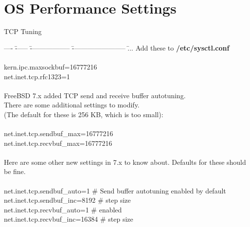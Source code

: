 \documentclass[xcolor=dvipsnames]{beamer}
\begin{document}
\section{OS Performance Settings}
	\begin{frame}{TCP Tuning}
	\scriptsize
	{
	\begin{tabbing}
		---- \= ------ \= ------------------ \= ------------------------ \=  ... \kill
		Add these to \textbf{/etc/sysctl.conf} \\ \\
		\> kern.ipc.maxsockbuf=16777216 \\
		\> net.inet.tcp.rfc1323=1 \\
		\\ FreeBSD 7.x added TCP send and receive buffer autotuning.
		\\ There are some additional settings to modify.
		\\ (The default for these is 256 KB, which is too small):\\ \\
		\> net.inet.tcp.sendbuf\_max=16777216 \\
		\> net.inet.tcp.recvbuf\_max=16777216 \\
		\\ Here are some other new settings in 7.x to know about. Defaults for these should be fine.\\ \\
		\> net.inet.tcp.sendbuf\_auto=1    \>\>\> \# Send buffer autotuning enabled by default\\
		\> net.inet.tcp.sendbuf\_inc=8192  \>\>\> \# step size\\
		\> net.inet.tcp.recvbuf\_auto=1    \>\>\> \# enabled\\
		\> net.inet.tcp.recvbuf\_inc=16384 \>\>\> \# step size\\
	\end{tabbing}
	}
	\end{frame}
\end{document}
